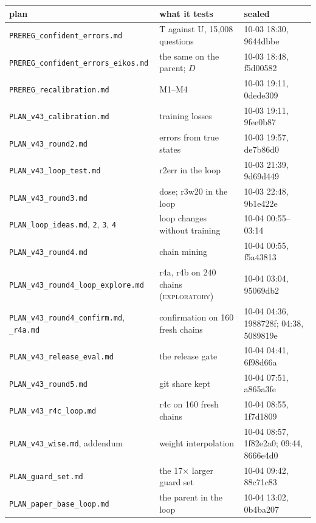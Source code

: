 \documentclass[11pt]{article}
\newcommand{\explo}{\textsc{exploratory}}
\begin{document}
\begin{center}\footnotesize
\begin{tabular}{p{5.6cm}p{4.9cm}p{3.6cm}}
\toprule
plan & what it tests & sealed \\
\midrule
\texttt{PREREG\_confident\_errors.md} & T against U, 15,008 questions & 10-03 18:30, 9644dbbe \\
\texttt{PREREG\_confident\_errors\_eikos.md} & the same on the parent; $D$ & 10-03 18:48, f5d00582 \\
\texttt{PREREG\_recalibration.md} & M1--M4 & 10-03 19:11, 0dede309 \\
\texttt{PLAN\_v43\_calibration.md} & training losses & 10-03 19:11, 9fee0b87 \\
\texttt{PLAN\_v43\_round2.md} & errors from true states & 10-03 19:57, de7b86d0 \\
\texttt{PLAN\_v43\_loop\_test.md} & r2err in the loop & 10-03 21:39, 9d69d449 \\
\texttt{PLAN\_v43\_round3.md} & dose; r3w20 in the loop & 10-03 22:48, 9b1e422e \\
\texttt{PLAN\_loop\_ideas.md}, \texttt{2}, \texttt{3}, \texttt{4} & loop changes without training & 10-04 00:55--03:14 \\
\texttt{PLAN\_v43\_round4.md} & chain mining & 10-04 00:55, f5a43813 \\
\texttt{PLAN\_v43\_round4\_loop\_explore.md} & r4a, r4b on 240 chains (\explo) & 10-04 03:04, 95069db2 \\
\texttt{PLAN\_v43\_round4\_confirm.md}, \texttt{\_r4a.md} & confirmation on 160 fresh chains & 10-04 04:36, 1988728f; 04:38, 5089819e \\
\texttt{PLAN\_v43\_release\_eval.md} & the release gate & 10-04 04:41, 6f98d66a \\
\texttt{PLAN\_v43\_round5.md} & git share kept & 10-04 07:51, a865a3fe \\
\texttt{PLAN\_v43\_r4c\_loop.md} & r4c on 160 fresh chains & 10-04 08:55, 1f7d1809 \\
\texttt{PLAN\_v43\_wise.md}, addendum & weight interpolation & 10-04 08:57, 1f82e2a0; 09:44, 8666e4d0 \\
\texttt{PLAN\_guard\_set.md} & the 17$\times$ larger guard set & 10-04 09:42, 88c71c83 \\
\texttt{PLAN\_paper\_base\_loop.md} & the parent in the loop & 10-04 13:02, 0b4ba207 \\
\bottomrule
\end{tabular}
\end{center}
\end{document}

